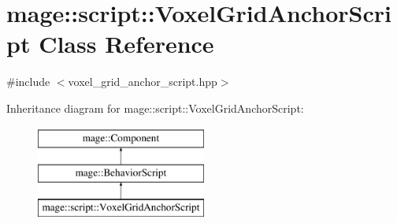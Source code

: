 \hypertarget{classmage_1_1script_1_1_voxel_grid_anchor_script}{}\section{mage\+:\+:script\+:\+:Voxel\+Grid\+Anchor\+Script Class Reference}
\label{classmage_1_1script_1_1_voxel_grid_anchor_script}


{\ttfamily \#include $<$voxel\+\_\+grid\+\_\+anchor\+\_\+script.\+hpp$>$}

Inheritance diagram for mage\+:\+:script\+:\+:Voxel\+Grid\+Anchor\+Script\+:\begin{figure}[H]
\begin{center}
\leavevmode
\includegraphics[height=3.000000cm]{classmage_1_1script_1_1_voxel_grid_anchor_script}
\end{center}
\end{figure}
